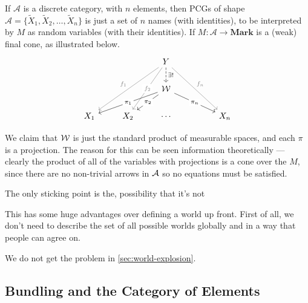 \documentclass{article}
\begin{document}
	\begin{example}
		If $\mathcal A$ is a discrete category, with $n$ elements, then PCGs of shape $\mathcal A = \{\tilde X_1, \tilde X_2, \ldots, \tilde X_n\}$ is just a set of $n$ names (with identities), to be interpreted by $M$ as random variables (with their identities). If $M : \mathcal A \to \mathbf{Mark}$ is a (weak) final cone, as illustrated below.
		\[ \begin{tikzcd}
				&& Y  \ar[ddll, gray, "f_1"']\ar[ddl,gray, "f_2"description]\ar[ddrr,gray, "f_n"] \ar[d, dashed, "\exists!"]\\
				&& \mathcal W \ar[dll, "\pi_1"description]\ar[dl, "\pi_2"description]\ar[drr, "\pi_n"description] \\
				X_1 & X_2 & \cdots & & X_n
			\end{tikzcd} \]
			
		We claim that $\cal W$ is just the standard product of measurable spaces, and each $\pi$ is a projection. The reason for this can be seen information theoretically --- clearly the product of all of the variables with projections is a cone over the $M$, since there are no non-trivial arrows in $\cal A$ so no equations must be satisfied. %
		
		The only sticking point is the, possibility that it's not  %
	\end{example}

	This has some huge advantages over defining a world up front. First of all, we don't need to describe the set of all possible worlds globally and in a way that people can agree on. 
	
	We do not get the problem in \ref{sec:world-explosion}.
	
	
	\begin{example}
	\end{example}
	
	\begin{example}
		\todo{filtered limit}
	\end{example}

	\begin{conj}
	\end{conj}
	
	\subsection{Bundling and the Category of Elements}
\end{document}
